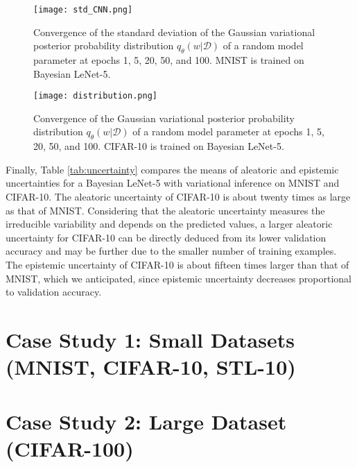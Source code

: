 %
\begin{figure}[b!] 
\begin{center}
\texttt{[image: std\_CNN.png]}
\caption{Convergence of the standard deviation of the Gaussian variational posterior probability distribution $q_{\theta}(w|\mathcal{D})$ of a random model parameter at epochs 1, 5, 20, 50, and 100. MNIST is trained on Bayesian LeNet-5.}
\label{fig:std_CNN}
\end{center}
\end{figure} 
%
\begin{figure}[t!] 
\begin{center}
\texttt{[image: distribution.png]}
\caption{Convergence of the Gaussian variational posterior probability distribution $q_{\theta}(w|\mathcal{D})$ of a random model parameter at epochs 1, 5, 20, 50, and 100. CIFAR-10 is trained on Bayesian LeNet-5.}
\label{fig:distribution}
\end{center}
\end{figure} 
%
\newline Finally, Table \ref{tab:uncertainty} compares the means of aleatoric and epistemic uncertainties for a Bayesian LeNet-5 with variational inference on MNIST and CIFAR-10. The aleatoric uncertainty of CIFAR-10 is about twenty times as large as that of MNIST. Considering that the aleatoric uncertainty measures the irreducible variability and depends on the predicted values, a larger aleatoric uncertainty for CIFAR-10 can be directly deduced from its lower validation accuracy and may be further due to the smaller number of training examples. The epistemic uncertainty of CIFAR-10 is about fifteen times larger than that of MNIST, which we anticipated, since epistemic uncertainty decreases proportional to validation accuracy. 
\begin{table}[t!]
\tiny
    \centering
    \renewcommand{\arraystretch}{1.5}
    \renewcommand{\arraystretch}{1.5}
    \caption{Aleatoric and epistemic uncertainty for Bayesian LeNet-5 calculated for MNIST and CIFAR-10, computed as proposed by Kwon et al. \cite{kwon2018uncertainty}.}
    \label{tab:uncertainty}
\end{table}
%
\section{Case Study 1: Small Datasets (MNIST, CIFAR-10, STL-10)}
\section{Case Study 2: Large Dataset (CIFAR-100)}

\ifpdf
    \graphicspath{{Chapter2/Figs/Raster/}{Chapter2/Figs/PDF/}{Chapter2/Figs/}}
\else
    \graphicspath{{Chapter2/Figs/Vector/}{Chapter2/Figs/}}
\fi


